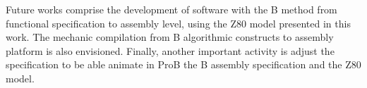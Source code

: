 \documentclass[11pt]{article} %
\begin{document}
Future works comprise the development of software with the B method from
functional specification to assembly level, using the Z80 model presented in this
work. The mechanic compilation from B algorithmic constructs to assembly platform
is also envisioned. Finally, another important activity is adjust the
specification to be able animate in ProB\cite{proB} the B assembly specification
and the Z80 model.



  



% 
\end{document}
